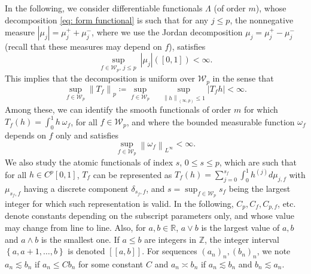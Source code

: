 \documentclass[preprint]{imsart}
\newcommand\norm[1]{\left\lVert#1\right\rVert}
\numberwithin{equation}{section}
\begin{document}
In the following, we consider differentiable functionals $\Lambda$ (of order $m$), whose decomposition \eqref{eq: form functional} is such that for any $j\leq p$, the nonnegative measure $|\mu_j|= \mu_j^++\mu_j^-$, where we use the Jordan decomposition $\mu_j= \mu_j^+-\mu_j^-$ (recall that these measures may depend on $f$), satisfies
\begin{equation}\label{eq:bound total var}\underset{f\in \mathcal{W}_p,\, j\leq p}{\sup}\ |\mu_j|([0,1])<\infty.\end{equation} 
This implies that the decomposition is uniform over $\mathcal{W}_p$ in the sense that
\begin{equation}\label{eq: bound deriv func}\underset{f\in \mathcal{W}_p}{\sup} \norm{T_f}_p\coloneqq \underset{f\in \mathcal{W}_p}{\sup}\quad  \underset{\norm{h}_{(\infty, p)}\leq 1}{\sup} \left|T_fh\right|<\infty.\end{equation}
Among these, we can identify the smooth functionals of order $m$ for which $T_f(h)=\int_0^1 h\ \omega_f$, for all $f\in\mathcal{W}_p$, and where the bounded measurable function $\omega_f$ depends on $f$ only and satisfies
\begin{equation}\label{eq: bound deriv omega}\underset{f\in\mathcal{W}_p}{\sup} \norm{\omega_f}_{L^\infty} < \infty.\end{equation}
We also study the atomic functionals of index $s$, $0\leq s\leq p$, which are such that for all $h\in C^p[0,1]$, $T_f$ can be represented as
$T_f(h)=\sum_{j=0}^{s_f} \int_0^1 h^{(j)} d\mu_{j,f}$
with $\mu_{s_f,f}$ having a discrete component $\delta_{s_f,f}$, and $s = \sup_{f\in\mathcal W_p} s_f$ being the largest integer for which such representation is valid. In the following, $C_p, C_{f}, C_{p,f}$, etc. denote constants depending on the subscript parameters only, and whose value may change from line to line. Also, for $a,b\in \mathbb{R}$, $a\vee b$ is the largest value of $a,b$ and $a\wedge b$ is the smallest one. If $a\leq b$ are integers in $\mathbb{Z}$, the integer interval $\left\{a,a+1,\dots,b\right\}$ is denoted $[\![ a,b]\!]$. For sequences $(a_n)_n,(b_n)_n$, we note $a_n\lesssim b_n$ if $a_n\leq Cb_n$ for some constant $C$ and $a_n\asymp b_n$ if $a_n\lesssim b_n$ and $b_n\lesssim a_n$.
\end{document}
